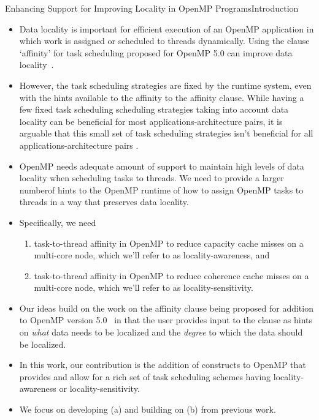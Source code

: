 \begin{frame}{Enhancing Support for Improving Locality in OpenMP Programs}{Introduction} 
\begin{itemize}
\tiny \item \tiny Data locality is important for efficient execution of an OpenMP application in which work is assigned or scheduled to threads dynamically. Using the clause ‘affinity’ for task scheduling proposed for OpenMP 5.0 can improve data   locality~\cite{ompaffclause}. 
\item \tiny However, the task scheduling strategies are fixed by the runtime system, even with the hints available to the affinity to the affinity clause. While having a few fixed task scheduling scheduling strategies taking into account data locality can be beneficial for most applications-architecture pairs, it is arguable that this small set of task scheduling strategies isn’t beneficial for all applications-architecture pairs \cite{dynwork2, dynwork, worksteal99,DonfackMulticore, DPLASMA,Kulkarni08schedulingstrategies}. 

\item \tiny OpenMP needs adequate amount of support to maintain high levels of data locality when scheduling tasks to threads. We need to provide a larger numberof hints to the OpenMP runtime of how to assign OpenMP tasks to threads in a way that preserves data locality.

\item \tiny Specifically, we need 
\begin{enumerate} 
\tiny \item \tiny task-to-thread affinity in OpenMP to reduce capacity cache misses on a multi-core node, which we’ll refer to as locality-awareness, and 
\item \tiny task-to-thread affinity in OpenMP to reduce coherence cache misses on a multi-core node, which we’ll refer to as locality-sensitivity.
\end{enumerate} 
\item \tiny Our ideas build on the work on the affinity clause being proposed for addition to OpenMP version 5.0~\cite{OpenMP} in that the user provides input to the clause as hints on \textit{what} data needs to be localized and the \textit{degree} to which the data should be localized. 
\item \tiny In this work, our contribution is the addition of constructs to OpenMP that provides and allow for a rich set of task scheduling schemes having locality-awareness or locality-sensitivity. 
\item \tiny We focus on developing (a) and building on (b) from previous work.
\end{itemize} 
\end{frame}

